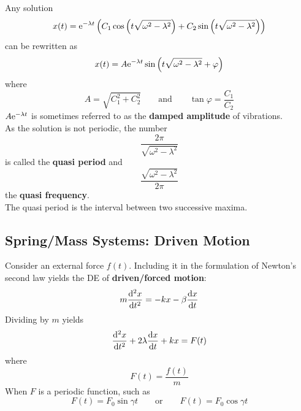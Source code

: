 \documentclass[./Differential Equations.tex]{subfiles}
\begin{document}
				Any solution
					\[x(t) = \text{e}^{-\lambda t}\left(C_1\cos\left(t\sqrt{\omega^2 - \lambda^2}\right) + C_2\sin\left(t\sqrt{\omega^2 - \lambda^2}\right)\right)\]
					can be rewritten as
					\[x(t) = A\text{e}^{-\lambda t}\sin\left(t\sqrt{\omega^2 - \lambda^2} + \varphi\right)\]
					where
					\[
						A = \sqrt{C_1^2 + C_2^2} \qquad \text{and} \qquad
						\tan\varphi = \frac{C_1}{C_2}
					\]
					\(A\text{e}^{-\lambda t}\) is sometimes referred to as the \textbf{damped amplitude} of vibrations. \\
				As the solution is not periodic, the number
					\[\frac{2\pi}{\sqrt{\omega^2 - \lambda^2}}\]	
					is called the \textbf{quasi period} and
					\[\frac{\sqrt{\omega^2 - \lambda^2}}{2\pi}\]
					the \textbf{quasi frequency}. \\
					The quasi period is the interval between two successive maxima.
		\subsection{Spring/Mass Systems: Driven Motion}
				Consider an external force \(f(t)\). Including it in the formulation of Newton's second law yields the DE of \textbf{driven/forced motion}:
					\[m\dv[2]{x}{t} = -kx - \beta\dv{x}{t}\]
					Dividing by \(m\) yields
					\[\dv[2]{x}{t} + 2\lambda\dv{x}{t} + kx = F(t)\]
					where 
					\[F(t) = \frac{f(t)}{m}\]
				When \(F\) is a periodic function, such as
					\[F(t) = F_0\sin\gamma t \qquad \text{or} \qquad F(t) = F_0\cos\gamma t\]
\end{document}
